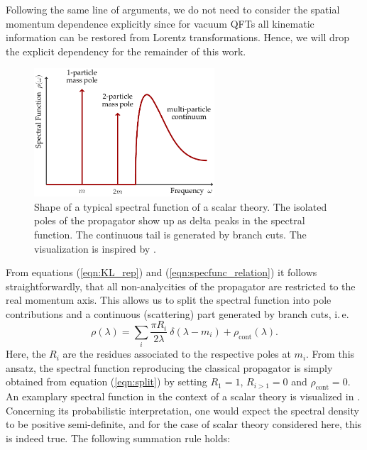 Following the same line of arguments, we do not need to consider the spatial momentum dependence explicitly since for vacuum QFTs all kinematic information can be restored from Lorentz transformations. Hence, we will drop the explicit dependency for the remainder of this work.  \\ 
\begin{figure}[t]
\centering
\includegraphics[width=0.6\textwidth]{figs/tikz/scalar_spec_func}
\caption[Shape of a typical spectral function of a scalar theory.]{Shape of a typical spectral function of a scalar theory. The isolated poles of the propagator show up as delta peaks in the spectral function. The continuous tail is generated by branch cuts. The visualization is inspired by \cite{Horak2019}.}\label{fig:scalar_spec_func}
\end{figure}\noindent
From equations (\ref{eqn:KL_rep}) and (\ref{eqn:specfunc_relation}) it follows straightforwardly, that all non-analycities of the propagator are restricted to the real momentum axis. This allows us to split the spectral function into pole contributions and a continuous (scattering) part generated by branch cuts, i.\,e.
\begin{equation}
	\rho(\lambda) =\sum\limits_{i} \frac{\pi R_i}{2\lambda}\ \delta(\lambda-m_i) + \rho_{\mathrm{cont}}(\lambda). \label{eqn:split}
\end{equation}
Here, the $R_i$ are the residues associated to the respective poles at $m_i$.
From this ansatz, the spectral function reproducing the classical propagator is simply obtained from equation (\ref{eqn:split}) by setting $R_1 = 1$, $R_{i>1} = 0 $ and $\rho_{\mathrm{cont}}=0$. An examplary spectral function in the context of a scalar theory is visualized in .\\
Concerning its probabilistic interpretation, one would expect the spectral density to be positive semi-definite, and for the case of scalar theory considered here, this is indeed true. The following summation rule holds:

